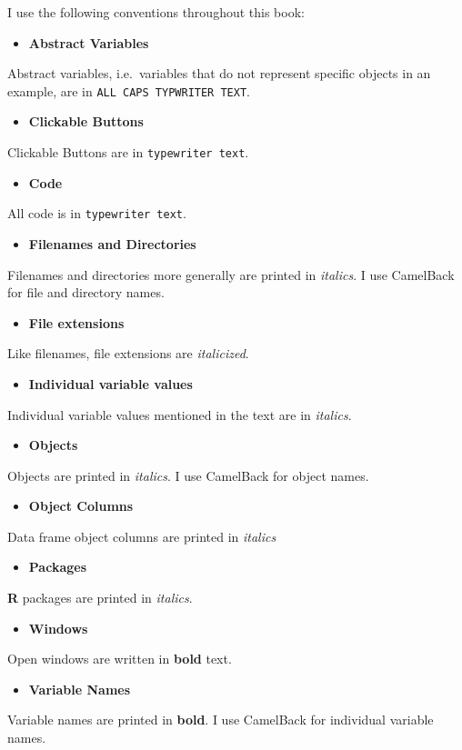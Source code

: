 I use the following conventions throughout this book:

\begin{itemize}
\item
  \textbf{Abstract Variables}
\end{itemize}
Abstract variables, i.e.~variables that do not represent specific
objects in an example, are in \texttt{ALL CAPS TYPWRITER TEXT}.

\begin{itemize}
\item
  \textbf{Clickable Buttons}
\end{itemize}
Clickable Buttons are in \texttt{typewriter text}.

\begin{itemize}
\item
  \textbf{Code}
\end{itemize}
All code is in \texttt{typewriter text}.

\begin{itemize}
\item
  \textbf{Filenames and Directories}
\end{itemize}
Filenames and directories more generally are printed in \emph{italics}.
I use CamelBack for file and directory names.

\begin{itemize}
\item
  \textbf{File extensions}
\end{itemize}
Like filenames, file extensions are \emph{italicized}.

\begin{itemize}
\item
  \textbf{Individual variable values}
\end{itemize}
Individual variable values mentioned in the text are in \emph{italics}.

\begin{itemize}
\item
  \textbf{Objects}
\end{itemize}
Objects are printed in \emph{italics}. I use CamelBack for object names.

\begin{itemize}
\item
  \textbf{Object Columns}
\end{itemize}
Data frame object columns are printed in \emph{italics}

\begin{itemize}
\item
  \textbf{Packages}
\end{itemize}
\textbf{R} packages are printed in \emph{italics}.

\begin{itemize}
\item
  \textbf{Windows}
\end{itemize}
Open windows are written in \textbf{bold} text.

\begin{itemize}
\item
  \textbf{Variable Names}
\end{itemize}
Variable names are printed in \textbf{bold}. I use CamelBack for
individual variable names.
